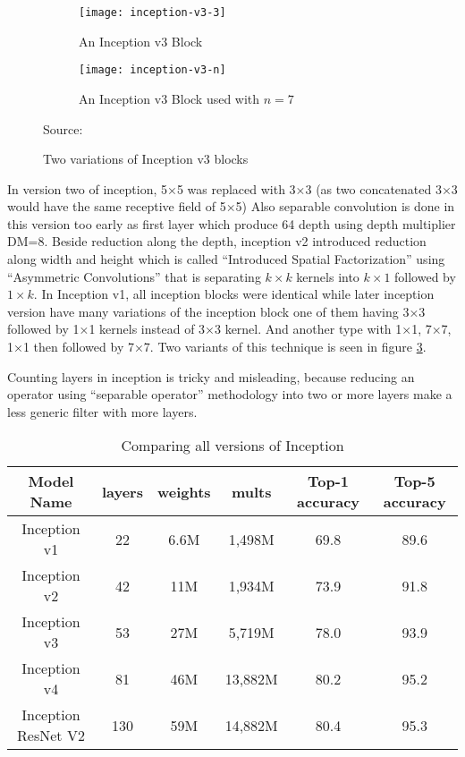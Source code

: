 \begin{figure}[!ht]
\centering
    \begin{subfigure}[b]{0.4\textwidth}
        \texttt{[image: inception-v3-3]}
        \caption{An Inception v3 Block}\label{fig:inception-v3-3}
    \end{subfigure}
    \begin{subfigure}[b]{0.4\textwidth}
        \texttt{[image: inception-v3-n]}
        \caption{An Inception v3 Block used with \(n=7\)}\label{fig:inception-v3-n}
    \end{subfigure}
\caption{Two variations of Inception v3 blocks }\label{fig:inception-v3}
{Source: \autocite{szegedy2016rethinking}}
\end{figure}



In version two of inception, 5×5 was replaced with 3×3 (as two concatenated 3×3 would have the same receptive field of 5×5)
Also separable convolution is done in this version too early as first layer which produce 64 depth using depth multiplier DM=8.
Beside reduction along the depth, inception v2 introduced reduction along width and height which is called
``Introduced Spatial Factorization'' using
``Asymmetric Convolutions'' that is separating \(k\times k\) kernels into \(k\times 1\) followed by \( 1\times k \).
In Inception v1, all inception blocks were identical while later inception version have many variations of the inception block
one of them having 3×3 followed by 1×1 kernels instead of 3×3 kernel. And another type with 1×1, 7×7, 1×1 then followed by 7×7.
Two variants of this technique is seen in figure \ref{fig:inception-v3}.

Counting layers in inception is tricky and misleading,
because reducing an operator using ``separable operator'' methodology into two or more layers make a less generic filter with more layers.


\begin{table*}\caption{Comparing all versions of Inception}\label{table:inception-ver-1-4}
\centering
\begin{tabular}{@{}cccccc@{}}
\toprule
Model Name & layers & weights & mults & Top-1 accuracy & Top-5 accuracy \\
\midrule
Inception v1 & 22 & 6.6M & 1,498M & 69.8 & 89.6 \\
Inception v2 & 42 & 11M & 1,934M & 73.9 & 91.8 \\
Inception v3 & 53 & 27M & 5,719M & 78.0 & 93.9 \\
Inception v4 & 81 & 46M & 13,882M & 80.2 & 95.2 \\
Inception ResNet V2 & 130 & 59M & 14,882M & 80.4 & 95.3 \\
\bottomrule
\end{tabular}
\end{table*}

